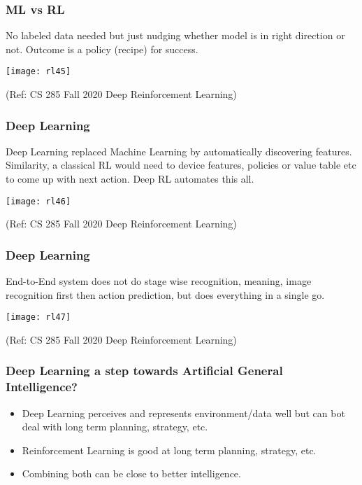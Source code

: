 \begin{frame}[fragile]\frametitle{ML vs RL}

No labeled data needed but just nudging whether model is in right direction or not. Outcome is a policy (recipe) for success.

\begin{center}
\texttt{[image: rl45]}
\end{center}

{\tiny (Ref: CS 285 Fall 2020 Deep Reinforcement Learning)}

\end{frame}

\begin{frame}[fragile]\frametitle{Deep Learning}

Deep Learning replaced Machine Learning by automatically discovering features. Similarity, a classical RL would need to device features, policies or value table etc to come up with next action. Deep RL automates this all.

\begin{center}
\texttt{[image: rl46]}
\end{center}


{\tiny (Ref: CS 285 Fall 2020 Deep Reinforcement Learning)}

\end{frame}


\begin{frame}[fragile]\frametitle{Deep Learning}

End-to-End system does not do stage wise recognition, meaning, image recognition first then action prediction, but does everything in a single go.

\begin{center}
\texttt{[image: rl47]}
\end{center}


{\tiny (Ref: CS 285 Fall 2020 Deep Reinforcement Learning)}

\end{frame}

\begin{frame}[fragile]\frametitle{Deep Learning a step towards Artificial General Intelligence?}

\begin{itemize}
\item Deep Learning perceives and represents environment/data well but can bot deal with long term planning, strategy, etc.
\item Reinforcement Learning is good at long term planning, strategy, etc.
\item Combining both can be close to better intelligence. 
\end{itemize}

\end{frame}

